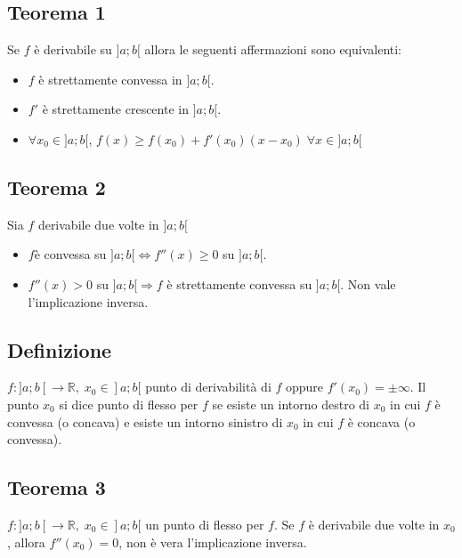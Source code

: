 \subsection{Teorema 1}
Se $f$ \`e derivabile su $]a;b[$ allora le seguenti affermazioni sono equivalenti:
\begin{itemize}
\item $f$ \`e strettamente convessa in $]a;b[$.
\item $f'$ \`e strettamente crescente in $]a;b[$.
\item $\forall x_0\in]a;b[$, $f(x)\ge f(x_0)+f'(x_0)(x-x_0)\;\forall x\in ]a;b[$
\end{itemize}
\subsection{Teorema 2}
Sia $f$ derivabile due volte in $]a;b[$
\begin{itemize}
\item $f$\`e convessa su $]a;b[\Leftrightarrow f''(x)\ge 0$ su $]a;b[$.
\item $f''(x)>0$ su $]a;b[\Rightarrow f$ \`e strettamente convessa su $]a;b[$. Non vale l'implicazione inversa.
\end{itemize}
\subsection{Definizione}
$f:]a;b[\rightarrow\mathbb{R},\; x_0\in ]a;b[$ punto di derivabilit\`a di $f$ oppure $f'(x_0)=\pm\infty$. Il punto $x_0$ si dice punto di flesso per $f$ se esiste un intorno 
destro di $x_0$ in cui $f$ \`e convessa (o concava) e esiste un intorno sinistro di $x_0$ in cui $f$ \`e concava (o convessa).
\subsection{Teorema 3}
$f:]a;b[\rightarrow\mathbb{R},\; x_0\in ]a;b[$ un punto di flesso per $f$. Se $f$ \`e derivabile due volte in $x_0$, allora $f''(x_0)=0$, non \`e vera l'implicazione inversa.